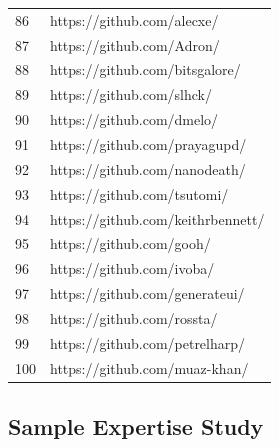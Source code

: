 \begin{center}
\begin{longtable}{|p{2cm}|p{7cm}|}
        86 & https://github.com/alecxe/ \\
        87 & https://github.com/Adron/ \\
        88 & https://github.com/bitsgalore/ \\
        89 & https://github.com/slhck/ \\
        90 & https://github.com/dmelo/ \\
        91 & https://github.com/prayagupd/ \\
        92 & https://github.com/nanodeath/ \\
        93 & https://github.com/tsutomi/ \\
        94 & https://github.com/keithrbennett/ \\
        95 & https://github.com/gooh/ \\
        96 & https://github.com/ivoba/ \\
        97 & https://github.com/generateui/ \\
        98 & https://github.com/rossta/ \\
        99 & https://github.com/petrelharp/ \\
        100 & https://github.com/muaz-khan/ \\
        
        \hline
        \end{longtable}
        \end{center}
        
    
    \subsection{Sample Expertise Study}
    
